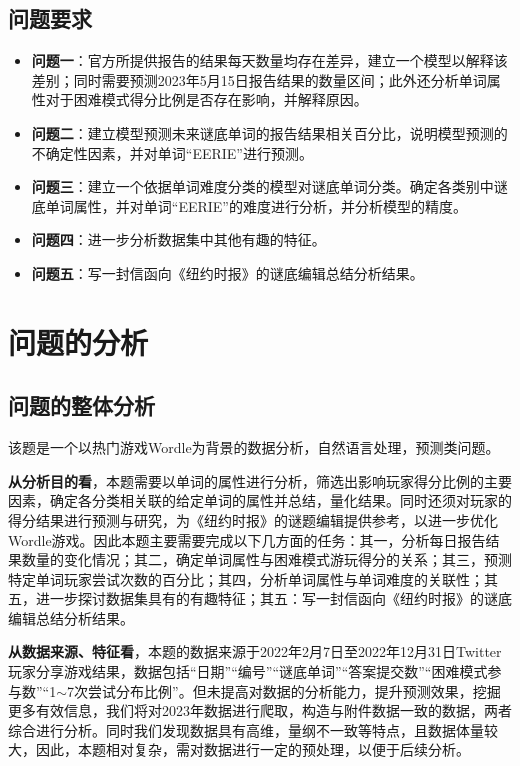\documentclass{MathModeling}
\begin{document}
	\subsection{问题要求}
	\begin{itemize}
		\item \textbf{问题一}：官方所提供报告的结果每天数量均存在差异，建立一个模型以解释该差别；同时需要预测2023年5月15日报告结果的数量区间；此外还分析单词属性对于困难模式得分比例是否存在影响，并解释原因。
		\item \textbf{问题二}：建立模型预测未来谜底单词的报告结果相关百分比，说明模型预测的不确定性因素，并对单词“EERIE”进行预测。
		\item \textbf{问题三}：建立一个依据单词难度分类的模型对谜底单词分类。确定各类别中谜底单词属性，并对单词“EERIE”的难度进行分析，并分析模型的精度。
		\item \textbf{问题四}：进一步分析数据集中其他有趣的特征。
		\item \textbf{问题五}：写一封信函向《纽约时报》的谜底编辑总结分析结果。
	\end{itemize}

	\section{问题的分析}
	\subsection{问题的整体分析}
	该题是一个以热门游戏Wordle为背景的数据分析，自然语言处理，预测类问题。

	\textbf{从分析目的看}，本题需要以单词的属性进行分析，筛选出影响玩家得分比例的主要因素，确定各分类相关联的给定单词的属性并总结，量化结果。同时还须对玩家的得分结果进行预测与研究，为《纽约时报》的谜题编辑提供参考，以进一步优化Wordle游戏。因此本题主要需要完成以下几方面的任务：{\heiti 其一}，分析每日报告结果数量的变化情况；{\heiti 其二}，确定单词属性与困难模式游玩得分的关系；{\heiti 其三}，预测特定单词玩家尝试次数的百分比；{\heiti 其四}，分析单词属性与单词难度的关联性；{\heiti 其五}，进一步探讨数据集具有的有趣特征；{\heiti 其五}：写一封信函向《纽约时报》的谜底编辑总结分析结果。

	\textbf{从数据来源、特征看}，本题的数据来源于2022年2月7日至2022年12月31日Twitter玩家分享游戏结果，数据包括“日期”“编号”“谜底单词”“答案提交数”“困难模式参与数”“1$\sim$7次尝试分布比例”。但未提高对数据的分析能力，提升预测效果，挖掘更多有效信息，我们将对2023年数据进行爬取，构造与附件数据一致的数据，两者综合进行分析。同时我们发现数据具有高维，量纲不一致等特点，且数据体量较大，因此，本题相对复杂，需对数据进行一定的预处理，以便于后续分析。
\end{document}
